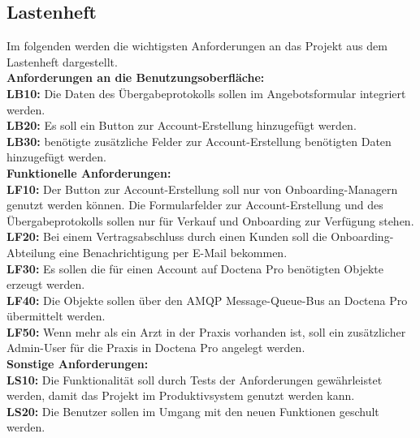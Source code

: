 \subsection{Lastenheft}
\label{sec:Lastenheft}
Im folgenden werden die wichtigsten Anforderungen an das Projekt aus dem Lastenheft dargestellt.\\[1.5ex]
\textbf{Anforderungen an die Benutzungsoberfläche:}\\[1.5ex]
\textbf{LB10:} Die Daten des Übergabeprotokolls sollen im Angebotsformular integriert  werden.\\
\textbf{LB20:} Es soll ein Button zur Account-Erstellung hinzugefügt werden.\\
\textbf{LB30:} benötigte zusätzliche Felder zur Account-Erstellung benötigten Daten hinzugefügt werden.\\[1.5ex]
\textbf{Funktionelle Anforderungen:}\\[1.5ex]
\textbf{LF10:} Der Button zur Account-Erstellung soll nur von Onboarding-Managern genutzt werden können. Die Formularfelder zur Account-Erstellung und des Übergabeprotokolls sollen nur für Verkauf und Onboarding zur Verfügung stehen.\\
\textbf{LF20:} Bei einem Vertragsabschluss durch einen Kunden soll die Onboarding-Abteilung eine Benachrichtigung per E-Mail bekommen.\\
\textbf{LF30:} Es sollen die für einen Account auf Doctena Pro benötigten Objekte erzeugt werden.\\
\textbf{LF40:} Die Objekte sollen über den \ac{AMQP} Message-Queue-Bus an Doctena Pro übermittelt werden.\\
\textbf{LF50:} Wenn mehr als ein Arzt in der Praxis vorhanden ist, soll ein zusätzlicher Admin-User für die Praxis in Doctena Pro angelegt werden.\\[1.5ex]
\textbf{Sonstige Anforderungen:}\\[1.5ex]
\textbf{LS10:} Die Funktionalität soll durch Tests der Anforderungen gewährleistet werden, damit das Projekt im Produktivsystem genutzt werden kann.\\
\textbf{LS20:} Die Benutzer sollen im Umgang mit den neuen Funktionen geschult werden.


